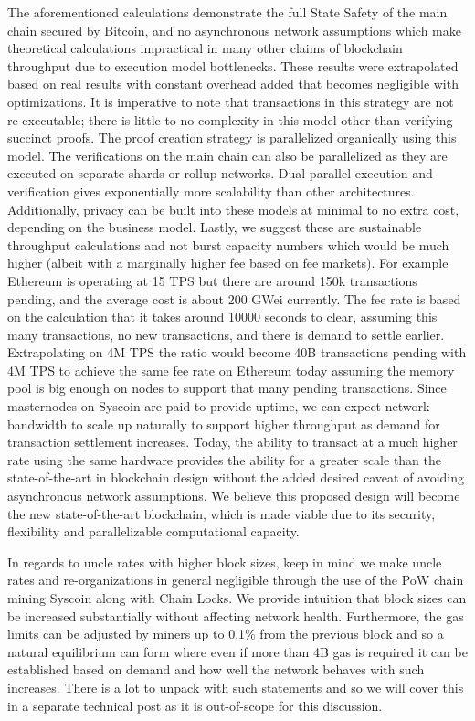 \documentclass[peerreview]{ieeesyscoin}
\begin{document}
The aforementioned calculations demonstrate the full State Safety of the main chain secured by Bitcoin, and no asynchronous network assumptions which make theoretical calculations impractical in many other claims of blockchain throughput due to execution model bottlenecks. These results were extrapolated based on real results with constant overhead added that becomes negligible with optimizations. It is imperative to  note that transactions in this strategy are not re-executable; there is little to no complexity in this model other than verifying succinct proofs. The proof creation strategy is parallelized organically using this model. The verifications on the main chain can also be parallelized as they are executed on separate shards or rollup networks. Dual parallel execution and verification gives exponentially more scalability than other architectures. Additionally, privacy can be built into these models at minimal to no extra cost, depending on the business model. Lastly, we suggest  these are sustainable throughput calculations and not burst capacity numbers which would be much higher (albeit with a marginally higher fee based on fee markets). For example Ethereum is operating at 15 TPS but there are around 150k transactions pending, and the average cost is about 200 GWei currently. The fee rate is based on the calculation that it  takes around 10000 seconds to clear, assuming this many transactions, no new transactions, and there is demand to settle earlier. Extrapolating on 4M TPS the ratio would become 40B transactions pending with 4M TPS to achieve the same fee rate on Ethereum today assuming the memory pool is big enough on nodes to support that many pending transactions. Since masternodes on Syscoin are paid to provide uptime, we can expect network bandwidth to scale up naturally to support higher throughput as demand for transaction settlement increases. Today, the ability to transact at a much higher rate using the same hardware provides the ability for a greater scale than the state-of-the-art in blockchain design without the added desired caveat of avoiding asynchronous network assumptions. We believe this proposed design will become the new state-of-the-art blockchain, which is made viable due to its security, flexibility and parallelizable computational capacity.

In regards to uncle rates with higher block sizes, keep in mind we make uncle rates and re-organizations in general negligible through the use of the PoW chain mining Syscoin along with Chain Locks. We provide intuition that block sizes can be increased substantially without affecting network health. Furthermore, the gas limits can be adjusted by miners up to 0.1\% from the previous block and so a natural equilibrium can form where even if more than 4B gas is required it can be established based on demand and how well the network behaves with such increases. There is a lot to unpack with such statements and so we will cover this in a separate technical post as it is out-of-scope for this discussion. 
\end{document}
